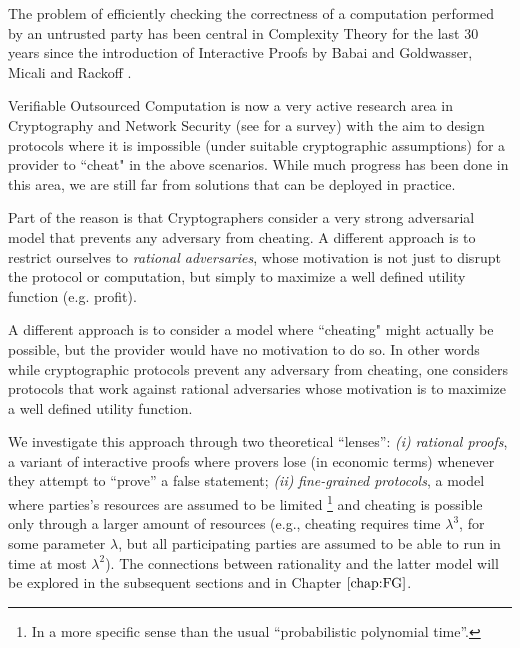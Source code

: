 

The problem of efficiently checking the correctness of a computation performed by an untrusted party has been central in Complexity Theory for the last 30 years since the introduction of Interactive Proofs by Babai and Goldwasser, Micali and Rackoff \cite{babai,gmr}. 

{\sf Verifiable Outsourced Computation} is now a very active research area in Cryptography and Network Security (see \cite{wb15} for a survey) with the aim to design protocols where it is impossible (under suitable cryptographic assumptions) for a provider to ``cheat" in the above scenarios. While much progress has been done in this area, we are still far from solutions that can be deployed in practice. 

Part of the reason is that Cryptographers consider a very strong adversarial model that prevents {\sf any} adversary from cheating. A different approach is to restrict ourselves to {\em rational adversaries}, whose motivation is not just to disrupt the protocol or computation, but simply to maximize a well defined utility function (e.g. profit).

A different approach is to consider a model where ``cheating" might actually be possible, but the provider would have no motivation to do so. In other words while cryptographic protocols prevent {\sf any} adversary from cheating, one considers protocols that work against {\sf rational} adversaries whose motivation is to maximize a well defined utility function. 

We investigate this approach through two theoretical ``lenses'': \textit{(i)} \textit{rational proofs}, a variant of interactive proofs where provers lose (in economic terms) whenever they attempt to ``prove'' a false statement; \textit{(ii)} \textit{fine-grained protocols}, a model where parties's resources are assumed to be limited \footnote{In a more specific sense than the usual ``probabilistic polynomial time''.} and cheating is possible only through a larger amount of resources (e.g., cheating requires time $\lambda^3$, for some parameter $\lambda$, but all participating parties are assumed to be able to run in time at most $\lambda^2$). The connections between rationality and the latter model will be explored in the subsequent sections and in Chapter $\ref{chap:FG}$.

